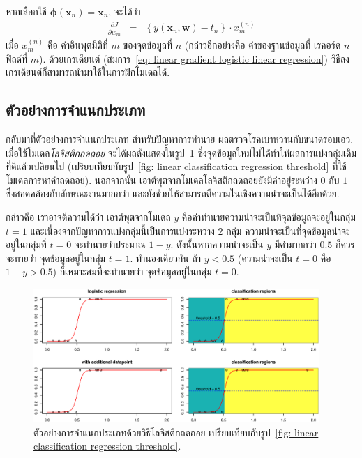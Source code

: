 หากเลือกใช้ $\mathbf{\phi}(\mathbf{x}_n) = \mathbf{x}_n$, จะได้ว่า
\begin{eqnarray}
   \frac{\partial J}{\partial w_m} &=& \left\{ y(\mathbf{x}_n, \mathbf{w}) - t_n\right\} \cdot x_m^{(n)}
\label{eq: linear gradient logistic linear regression}
\end{eqnarray}
เมื่อ $x_m^{(n)}$ คือ ค่าอินพุตมิติที่ $m$ ของจุดข้อมูลที่ $n$ 
(กล่าวอีกอย่างคือ ค่าของฐานข้อมูลที่ เรคอร์ด $n$ ฟิลด์ที่ $m$).
ด้วยเกรเดียนต์ (สมการ~\ref{eq: linear gradient logistic linear regression}) วิธีลงเกรเดียนต์ก็สามารถนำมาใช้ในการฝึกโมเดลได้.

\subsection{ตัวอย่างการจำแนกประเภท}
\label{sec: logistic regression example}

กลับมาที่ตัวอย่างการจำแนกประเภท สำหรับปัญหาการทำนาย ผลตรวจโรคเบาหวานกับขนาดรอบเอว.
เมื่อใช้โมเดล\textit{โลจิสติกถดถอย} จะได้ผลดังแสดงในรูป~\ref{fig: linear classification log reg} 
ซึ่งจุดข้อมูลใหม่ไม่ได้ทำให้ผลการแบ่งกลุ่มเดิมที่ดีแล้วเปลี่ยนไป (เปรียบเทียบกับรูป~\ref{fig: linear classification regression threshold} ที่ใช้โมเดลการหาค่าถดถอย).
นอกจากนั้น เอาต์พุตจากโมเดลโลจิสติกถดถอยยังมีค่าอยู่ระหว่าง $0$ กับ $1$ 
ซึ่งสอดคล้องกับลักษณะงานมากกว่า และยังช่วยให้สามารถตีความในเชิงความน่าจะเป็นได้อีกด้วย.

กล่าวคือ เราอาจตีความได้ว่า เอาต์พุตจากโมเดล $y$ คือค่าทำนายความน่าจะเป็นที่จุดข้อมูลจะอยู่ในกลุ่ม $t = 1$ 
และเนื่องจากปัญหาการแบ่งกลุ่มนี้เป็นการแบ่งระหว่าง $2$ กลุ่ม 
ความน่าจะเป็นที่จุดข้อมูลน่าจะอยู่ในกลุ่มที่ $t = 0$ จะทำนายว่าประมาณ $1 - y$.
ดังนั้นหากความน่าจะเป็น $y$ มีค่ามากกว่า $0.5$ ก็ควรจะทายว่า จุดข้อมูลอยู่ในกลุ่ม $t = 1$.
ทำนองเดียวกัน ถ้า $y < 0.5$ (ความน่าจะเป็น $t=0$ คือ $1-y > 0.5$) ก็เหมาะสมที่จะทำนายว่า จุดข้อมูลอยู่ในกลุ่ม $t = 0$.

%
\begin{figure}
\begin{center}
\includegraphics[height=2in]{03Linear/logregExample.eps}
\end{center}
\caption{ตัวอย่างการจำแนกประเภทด้วยวิธีโลจิสติกถดถอย 
เปรียบเทียบกับรูป~\ref{fig: linear classification regression threshold}.}
\label{fig: linear classification log reg}
\end{figure}
%

